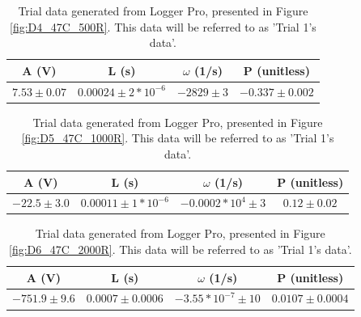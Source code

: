 \documentclass[12pt]{article}
\begin{document}
\begin{table}[h]
\centering
\begin{tabular}{|c|c|c|c|}
\hline
\textbf{A (V)} & \textbf{L (s)} & $\omega$ \textbf{(1/s)} & \textbf{P (unitless)} \\
\hline
$7.53 \pm 0.07$  & $0.00024 \pm 2*10^{-6}$  & $-2829 \pm 3$ & $-0.337 \pm 0.002$ \\
\hline
\end{tabular}
\caption{Trial data generated from Logger Pro, presented in Figure \ref{fig:D4_47C_500R}. This data will be referred to as 'Trial 1's data'.}
\label{tab:damped_trial_4}
\end{table}

\begin{table}[h]
\centering
\begin{tabular}{|c|c|c|c|}
\hline
\textbf{A (V)} & \textbf{L (s)} & $\omega$ \textbf{(1/s)} & \textbf{P (unitless)} \\
\hline
$-22.5 \pm 3.0$  & $0.00011 \pm 1*10^{-6}$  & $-0.0002*10^4 \pm 3$ & $0.12 \pm 0.02$ \\
\hline
\end{tabular}
\caption{Trial data generated from Logger Pro, presented in Figure \ref{fig:D5_47C_1000R}. This data will be referred to as 'Trial 1's data'.}
\label{tab:damped_trial_5}
\end{table}

\begin{table}[h]
\centering
\begin{tabular}{|c|c|c|c|}
\hline
\textbf{A (V)} & \textbf{L (s)} & $\omega$ \textbf{(1/s)} & \textbf{P (unitless)} \\
\hline
$-751.9 \pm 9.6$  & $0.0007 \pm 0.0006$  & $-3.55*10^{-7} \pm 10$ & $0.0107 \pm 0.0004$ \\
\hline
\end{tabular}
\caption{Trial data generated from Logger Pro, presented in Figure \ref{fig:D6_47C_2000R}. This data will be referred to as 'Trial 1's data'.}
\label{tab:damped_trial_6}
\end{table}
\end{document}
